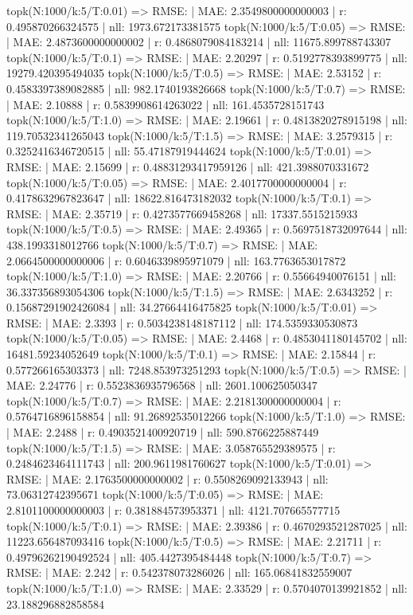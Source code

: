 topk(N:1000/k:5/T:0.01) => RMSE: | MAE: 2.3549800000000003 | r: 0.495870266324575 | nll: 1973.672173381575
topk(N:1000/k:5/T:0.05) => RMSE: | MAE: 2.4873600000000002 | r: 0.4868079084183214 | nll: 11675.899788743307
topk(N:1000/k:5/T:0.1) => RMSE: | MAE: 2.20297 | r: 0.5192778393899775 | nll: 19279.420395494035
topk(N:1000/k:5/T:0.5) => RMSE: | MAE: 2.53152 | r: 0.4583397389082885 | nll: 982.1740193826668
topk(N:1000/k:5/T:0.7) => RMSE: | MAE: 2.10888 | r: 0.5839908614263022 | nll: 161.4535728151743
topk(N:1000/k:5/T:1.0) => RMSE: | MAE: 2.19661 | r: 0.4813820278915198 | nll: 119.70532341265043
topk(N:1000/k:5/T:1.5) => RMSE: | MAE: 3.2579315 | r: 0.3252416346720515 | nll: 55.47187919444624
topk(N:1000/k:5/T:0.01) => RMSE: | MAE: 2.15699 | r: 0.48831293417959126 | nll: 421.3988070331672
topk(N:1000/k:5/T:0.05) => RMSE: | MAE: 2.4017700000000004 | r: 0.4178632967823647 | nll: 18622.816473182032
topk(N:1000/k:5/T:0.1) => RMSE: | MAE: 2.35719 | r: 0.4273577669458268 | nll: 17337.5515215933
topk(N:1000/k:5/T:0.5) => RMSE: | MAE: 2.49365 | r: 0.5697518732097644 | nll: 438.1993318012766
topk(N:1000/k:5/T:0.7) => RMSE: | MAE: 2.0664500000000006 | r: 0.6046339895971079 | nll: 163.7763653017872
topk(N:1000/k:5/T:1.0) => RMSE: | MAE: 2.20766 | r: 0.55664940076151 | nll: 36.337356893054306
topk(N:1000/k:5/T:1.5) => RMSE: | MAE: 2.6343252 | r: 0.15687291902426084 | nll: 34.27664416475825
topk(N:1000/k:5/T:0.01) => RMSE: | MAE: 2.3393 | r: 0.5034238148187112 | nll: 174.5359330530873
topk(N:1000/k:5/T:0.05) => RMSE: | MAE: 2.4468 | r: 0.4853041180145702 | nll: 16481.59234052649
topk(N:1000/k:5/T:0.1) => RMSE: | MAE: 2.15844 | r: 0.577266165303373 | nll: 7248.853973251293
topk(N:1000/k:5/T:0.5) => RMSE: | MAE: 2.24776 | r: 0.5523836935796568 | nll: 2601.100625050347
topk(N:1000/k:5/T:0.7) => RMSE: | MAE: 2.2181300000000004 | r: 0.5764716896158854 | nll: 91.26892535012266
topk(N:1000/k:5/T:1.0) => RMSE: | MAE: 2.2488 | r: 0.4903521400920719 | nll: 590.8766225887449
topk(N:1000/k:5/T:1.5) => RMSE: | MAE: 3.058765529389575 | r: 0.2484623464111743 | nll: 200.9611981760627
topk(N:1000/k:5/T:0.01) => RMSE: | MAE: 2.1763500000000002 | r: 0.5508269092133943 | nll: 73.06312742395671
topk(N:1000/k:5/T:0.05) => RMSE: | MAE: 2.8101100000000003 | r: 0.381884573953371 | nll: 4121.707665577715
topk(N:1000/k:5/T:0.1) => RMSE: | MAE: 2.39386 | r: 0.4670293521287025 | nll: 11223.656487093416
topk(N:1000/k:5/T:0.5) => RMSE: | MAE: 2.21711 | r: 0.49796262190492524 | nll: 405.4427395484448
topk(N:1000/k:5/T:0.7) => RMSE: | MAE: 2.242 | r: 0.542378073286026 | nll: 165.06841832559007
topk(N:1000/k:5/T:1.0) => RMSE: | MAE: 2.33529 | r: 0.5704070139921852 | nll: 23.188296882858584
